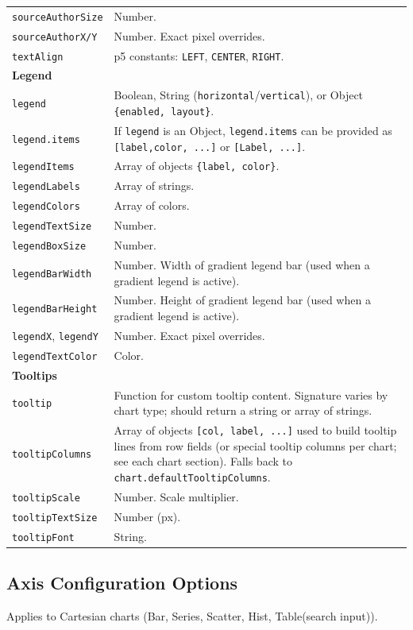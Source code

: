\documentclass[10pt, a4paper]{article}
\begin{document}
\begin{longtable}{p{5cm} p{10cm}}
\texttt{sourceAuthorSize} & Number. \\
\texttt{sourceAuthorX/Y} & Number. Exact pixel overrides. \\
\texttt{textAlign} & p5 constants: \texttt{LEFT}, \texttt{CENTER}, \texttt{RIGHT}. \\
\midrule
\textbf{Legend} & \\
\texttt{legend} & Boolean, String (\texttt{horizontal}/\texttt{vertical}), or Object \texttt{\{enabled, layout\}}. \\
\texttt{legend.items} & If \texttt{legend} is an Object, \texttt{legend.items} can be provided as \texttt{[{label,color}, ...]} or \texttt{[Label, ...]}. \\
\texttt{legendItems} & Array of objects \texttt{\{label, color\}}. \\
\texttt{legendLabels} & Array of strings. \\
\texttt{legendColors} & Array of colors. \\
\texttt{legendTextSize} & Number. \\
\texttt{legendBoxSize} & Number. \\
\texttt{legendBarWidth} & Number. Width of gradient legend bar (used when a gradient legend is active). \\
\texttt{legendBarHeight} & Number. Height of gradient legend bar (used when a gradient legend is active). \\
\texttt{legendX}, \texttt{legendY} & Number. Exact pixel overrides. \\
\texttt{legendTextColor} & Color. \\
\midrule
\textbf{Tooltips} & \\
\texttt{tooltip} & Function for custom tooltip content. Signature varies by chart type; should return a string or array of strings. \\
\texttt{tooltipColumns} & Array of objects \texttt{[{col, label}, ...]} used to build tooltip lines from row fields (or special tooltip columns per chart; see each chart section). Falls back to \texttt{chart.defaultTooltipColumns}. \\
\texttt{tooltipScale} & Number. Scale multiplier. \\
\texttt{tooltipTextSize} & Number (px). \\
\texttt{tooltipFont} & String. \\
\bottomrule
\end{longtable}

\subsection{Axis Configuration Options}
Applies to Cartesian charts (Bar, Series, Scatter, Hist, Table(search input)).
\end{document}
